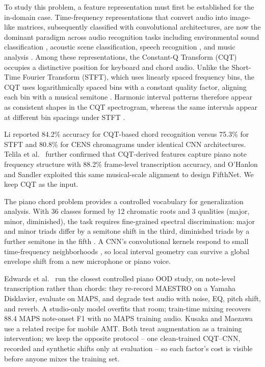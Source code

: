 \documentclass[pdflatex,sn-mathphys-num,iicol]{sn-jnl}
\theoremstyle{thmstyleone}
\theoremstyle{thmstyletwo}
\theoremstyle{thmstylethree}
\begin{document}
To study this problem, a feature representation must first be established for the in-domain case. Time-frequency representations that convert audio into image-like matrices, subsequently classified with convolutional architectures, are now the dominant paradigm across audio recognition tasks including environmental sound classification \cite{Wolf-Monheim2025}, acoustic scene classification, speech recognition \cite{Zaman2023}, and music analysis \cite{Moysis2023}. Among these representations, the Constant-Q Transform (CQT) occupies a distinctive position for keyboard and chord audio. Unlike the Short-Time Fourier Transform (STFT), which uses linearly spaced frequency bins, the CQT uses logarithmically spaced bins with a constant quality factor, aligning each bin with a musical semitone \cite{Lacoste2007}. Harmonic interval patterns therefore appear as consistent shapes in the CQT spectrogram, whereas the same intervals appear at different bin spacings under STFT \cite{Li2021}.

Li \cite{Li2021} reported 84.2\% accuracy for CQT-based chord recognition versus 75.3\% for STFT and 80.8\% for CENS chromagrams under identical CNN architectures. Telila et al.\ \cite{Telila2023} further confirmed that CQT-derived features capture piano note frequency structure with 88.2\% frame-level transcription accuracy, and O'Hanlon and Sandler \cite{OHanlon2021} exploited this same musical-scale alignment to design FifthNet. We keep CQT as the input.

The piano chord problem provides a controlled vocabulary for generalization analysis. With 36 classes formed by 12 chromatic roots and 3 qualities (major, minor, diminished), the task requires fine-grained spectral discrimination: major and minor triads differ by a semitone shift in the third, diminished triads by a further semitone in the fifth \cite{Harte2010}. A CNN's convolutional kernels respond to small time-frequency neighborhoods \cite{OShea2015}\cite{Purwono2022}, so local interval geometry can survive a global envelope shift from a new microphone or piano voice.

Edwards et al.\ \cite{Edwards2024} run the closest controlled piano OOD study, on note-level transcription rather than chords: they re-record MAESTRO on a Yamaha Disklavier, evaluate on MAPS, and degrade test audio with noise, EQ, pitch shift, and reverb. A studio-only model overfits that room; train-time mixing recovers 88.4 MAPS note-onset F1 with no MAPS training audio. Kusaka and Maezawa \cite{Kusaka2024} use a related recipe for mobile AMT. Both treat augmentation as a training intervention; we keep the opposite protocol -- one clean-trained CQT--CNN, recorded and synthetic shifts only at evaluation -- so each factor's cost is visible before anyone mixes the training set.
\end{document}
